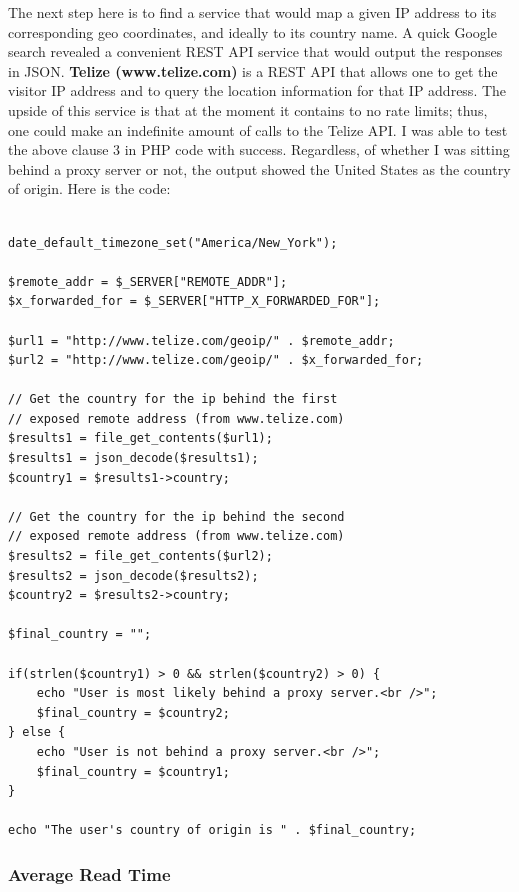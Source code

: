 \documentclass[12pt]{article}
\begin{document}
The next step here is to find a service that would map a given IP address to its corresponding geo coordinates, and ideally to its country name. A quick Google search revealed a convenient REST API service that would output the responses in JSON. \textbf{Telize (www.telize.com)} is a REST API that allows one to get the visitor IP address and to query the location information for that IP address. The upside of this service is that at the moment it contains to no rate limits; thus, one could make an indefinite amount of calls to the Telize API. I was able to test the above clause 3 in PHP code with success. Regardless, of whether I was sitting behind a proxy server or not, the output showed the United States as the country of origin. Here is the code:
\begin{lstlisting}

date_default_timezone_set("America/New_York");

$remote_addr = $_SERVER["REMOTE_ADDR"];
$x_forwarded_for = $_SERVER["HTTP_X_FORWARDED_FOR"];

$url1 = "http://www.telize.com/geoip/" . $remote_addr; 
$url2 = "http://www.telize.com/geoip/" . $x_forwarded_for; 

// Get the country for the ip behind the first
// exposed remote address (from www.telize.com)
$results1 = file_get_contents($url1);
$results1 = json_decode($results1);
$country1 = $results1->country;

// Get the country for the ip behind the second
// exposed remote address (from www.telize.com)
$results2 = file_get_contents($url2);
$results2 = json_decode($results2);
$country2 = $results2->country;

$final_country = "";

if(strlen($country1) > 0 && strlen($country2) > 0) {
	echo "User is most likely behind a proxy server.<br />"; 
	$final_country = $country2;
} else {
	echo "User is not behind a proxy server.<br />";
	$final_country = $country1;
}

echo "The user's country of origin is " . $final_country;

\end{lstlisting}   

\subsubsection{Average Read Time}
\end{document}
